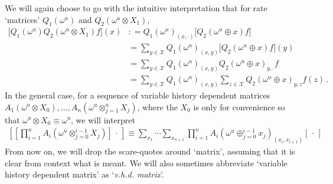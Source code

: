 \documentclass[a4paper,reqno]{amsart}
\newcommand{\states}{\mathcal{X}}
\newcommand{\coloneqq}{:\!=}
\begin{document}
We will again choose to go with the intuitive interpretation that for rate `matrices' $Q_1(\omega^u)$ and $Q_2(\omega^u\otimes X_1)$,
\begin{align*}
\bigl[Q_1(\omega^u)Q_2(\omega^u\otimes X_1)f\bigr](x) &\coloneqq Q_1(\omega^u)_{(x,\cdot)}\bigl[Q_2(\omega^u\oplus x)f\bigr] \\
 &= \sum_{y\in\states} Q_1(\omega^u)_{(x,y)}\bigl[Q_2(\omega^u\oplus x)f\bigr](y) \\
 &= \sum_{y\in\states} Q_1(\omega^u)_{(x,y)} Q_2(\omega^u\oplus x)_{y,\cdot}f \\
 &= \sum_{y\in\states} Q_1(\omega^u)_{(x,y)} \sum_{z\in\states}Q_2(\omega^u\oplus x)_{y,z}f(z)\,.
\end{align*}
In the general case, for a sequence of variable history dependent matrices $A_1(\omega^u\otimes X_0),\ldots,A_n(\omega^u\otimes_{j=1}^nX_j)$, where the $X_0$ is only for convenience so that $\omega^u\otimes X_0\equiv\omega^u$, we will interpret
\begin{align*}
\left[\left[\prod_{i=1}^n A_i(\omega^u\otimes_{j=0}^{i-1}X_j)\right]\,\cdot\,\right] \equiv \sum_{x_1}\cdots\sum_{x_{n+1}}\prod_{i=1}^{n}A_i(\omega^u\oplus_{j=0}^{i-1}x_j)_{(x_i,x_{i+1})}[\,\cdot\,]
\end{align*}
From now on, we will drop the scare-quotes around `matrix', assuming that it is clear from context what is meant. We will also sometimes abbreviate `variable history dependent matrix' as `\emph{v.h.d. matrix}'.
\end{document}

